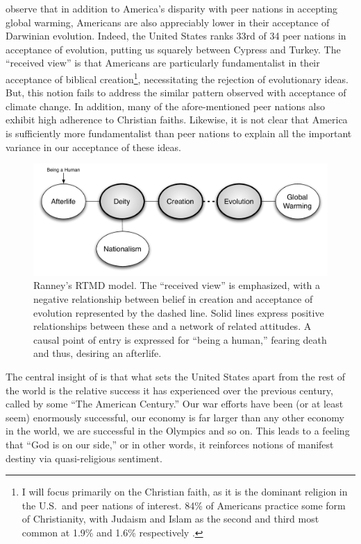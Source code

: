 
 observe that in addition to America's disparity
with peer nations in accepting global warming, Americans are also appreciably
lower in their acceptance of Darwinian evolution. Indeed, the United States
ranks 33rd of 34 peer nations in acceptance of evolution, putting us
squarely between Cypress and Turkey. The ``received view'' is that Americans are
particularly fundamentalist in their acceptance of biblical creation\footnote{I
will focus primarily on the Christian faith, as it is the dominant religion in
the U.S.\ and peer nations of interest. 84\% of Americans practice some form of
Christianity, with Judaism and Islam as the second and third most common at
1.9\% and 1.6\% respectively \cite{wolfram_alpha_faith}.}, 
necessitating the rejection of evolutionary ideas. But, this notion fails to
address the similar pattern observed with acceptance of climate change. In
addition, many of the afore-mentioned peer nations also exhibit high adherence
to Christian faiths.  Likewise, it is not clear that America is sufficiently
more fundamentalist than peer nations to explain all the important variance in
our acceptance of these ideas. 

\begin{figure}[h]
\centering
\includegraphics[width=\textwidth]{rtmd.pdf}
\caption{Ranney's RTMD model. The ``received view'' is emphasized, with
a negative relationship between belief in creation and acceptance of evolution
represented by the dashed line. Solid lines express positive relationships
between these and a network of related attitudes. A causal point of entry is
expressed for ``being a human,'' fearing death and thus, desiring an afterlife.}
\label{fig:rtmd} 
\end{figure}

The central insight of  is that what sets the
United States apart from the rest of the world is the relative success it has
experienced over the previous century, called by some ``The American Century.''
Our war efforts have been (or at least seem) enormously successful, our economy
is far larger than any other economy in the world, we are successful in the
Olympics and so on. This leads to a
feeling that ``God is on our side,'' or in other words, it reinforces notions of
manifest destiny via quasi-religious sentiment.


